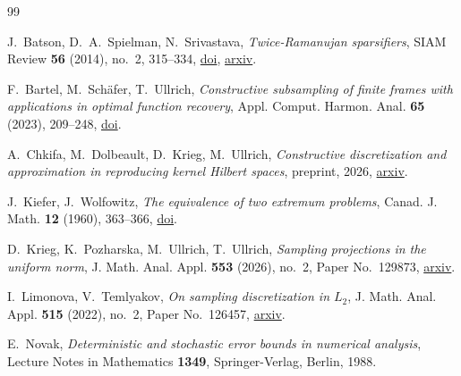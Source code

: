 \bpbibheading
\begin{thebibliography}{99}

J.~Batson, D.~A.~Spielman, N.~Srivastava,
\emph{Twice-Ramanujan sparsifiers},
SIAM Review \textbf{56} (2014), no.~2, 315--334,
\href{https://doi.org/10.1137/130949117}{doi},
\href{https://arxiv.org/abs/0808.0163}{arxiv}.

F.~Bartel, M.~Sch\"afer, T.~Ullrich,
\emph{Constructive subsampling of finite frames with applications in optimal function
recovery},
Appl. Comput. Harmon. Anal. \textbf{65} (2023), 209--248,
\href{https://doi.org/10.1016/j.acha.2023.02.004}{doi}.

A.~Chkifa, M.~Dolbeault, D.~Krieg, M.~Ullrich,
\emph{Constructive discretization and approximation in reproducing kernel Hilbert
spaces},
preprint, 2026,
\href{https://arxiv.org/abs/2602.18719}{arxiv}.

J.~Kiefer, J.~Wolfowitz,
\emph{The equivalence of two extremum problems},
Canad. J. Math. \textbf{12} (1960), 363--366,
\href{https://doi.org/10.4153/CJM-1960-030-4}{doi}.

D.~Krieg, K.~Pozharska, M.~Ullrich, T.~Ullrich,
\emph{Sampling projections in the uniform norm},
J. Math. Anal. Appl. \textbf{553} (2026), no.~2, Paper No.~129873,
\href{https://arxiv.org/abs/2401.02220}{arxiv}.

I.~Limonova, V.~Temlyakov,
\emph{On sampling discretization in $L_2$},
J. Math. Anal. Appl. \textbf{515} (2022), no.~2, Paper No.~126457,
\href{https://arxiv.org/abs/2009.10789}{arxiv}.

E.~Novak,
\emph{Deterministic and stochastic error bounds in numerical analysis},
Lecture Notes in Mathematics \textbf{1349}, Springer-Verlag, Berlin, 1988.

\end{thebibliography}
